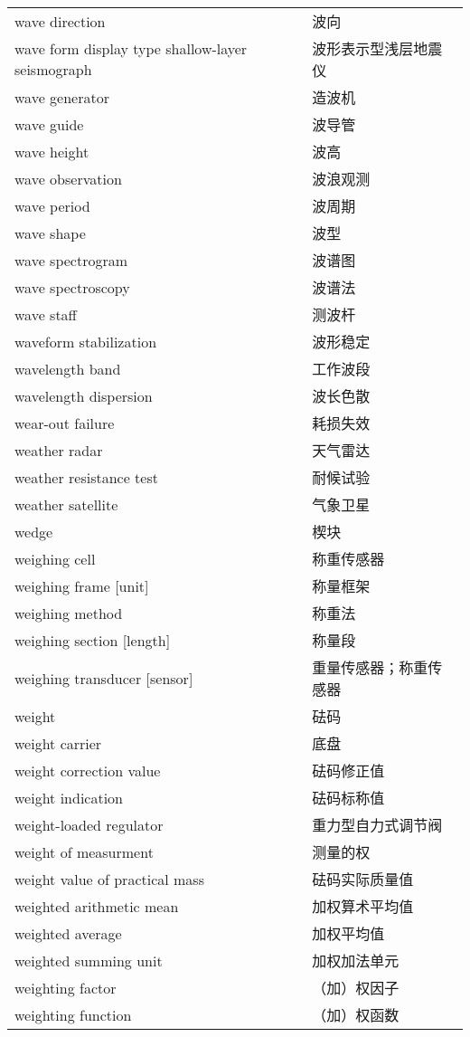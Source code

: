 \documentclass[
]{article}
\begin{document}
\begin{longtable}[]{@{}ll@{}}
wave direction & 波向 \\
wave form display type shallow-layer seismograph &
波形表示型浅层地震仪 \\
wave generator & 造波机 \\
wave guide & 波导管 \\
wave height & 波高 \\
wave observation & 波浪观测 \\
wave period & 波周期 \\
wave shape & 波型 \\
wave spectrogram & 波谱图 \\
wave spectroscopy & 波谱法 \\
wave staff & 测波杆 \\
waveform stabilization & 波形稳定 \\
wavelength band & 工作波段 \\
wavelength dispersion & 波长色散 \\
wear-out failure & 耗损失效 \\
weather radar & 天气雷达 \\
weather resistance test & 耐候试验 \\
weather satellite & 气象卫星 \\
wedge & 楔块 \\
weighing cell & 称重传感器 \\
weighing frame {[}unit{]} & 称量框架 \\
weighing method & 称重法 \\
weighing section {[}length{]} & 称量段 \\
weighing transducer {[}sensor{]} & 重量传感器；称重传感器 \\
weight & 砝码 \\
weight carrier & 底盘 \\
weight correction value & 砝码修正值 \\
weight indication & 砝码标称值 \\
weight-loaded regulator & 重力型自力式调节阀 \\
weight of measurment & 测量的权 \\
weight value of practical mass & 砝码实际质量值 \\
weighted arithmetic mean & 加权算术平均值 \\
weighted average & 加权平均值 \\
weighted summing unit & 加权加法单元 \\
weighting factor & （加）权因子 \\
weighting function & （加）权函数 \\

\end{longtable}
\end{document}

